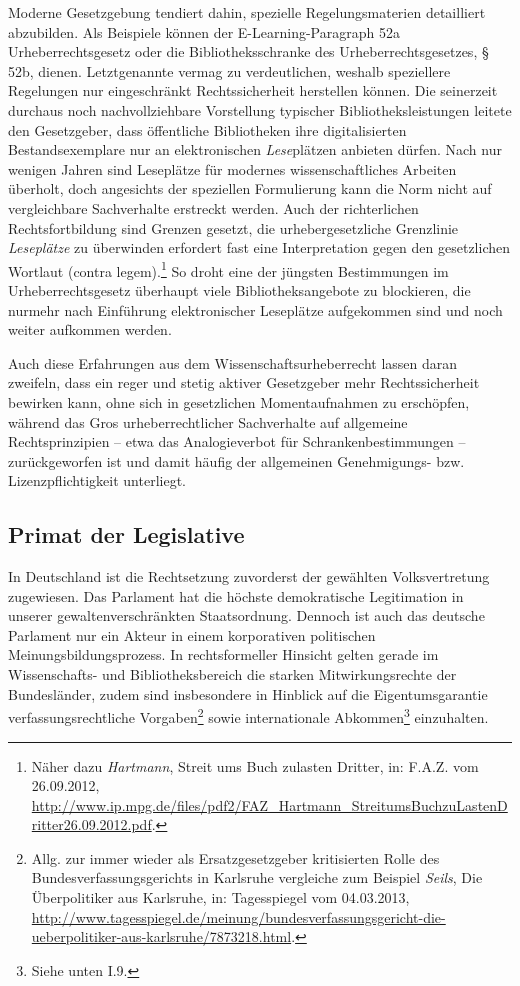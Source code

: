 \documentclass[output=paper]{langscibook}
\begin{document}
Moderne Gesetzgebung tendiert dahin, spezielle Regelungsmaterien
detailliert abzubilden. Als Beispiele können der E-Learning-Paragraph
52a Urheberrechtsgesetz oder die Bibliotheksschranke des
Urheberrechtsgesetzes, §\,52b, dienen. Letztgenannte vermag zu
verdeutlichen, weshalb speziellere Regelungen nur eingeschränkt
Rechtssicherheit herstellen können. Die seinerzeit durchaus noch
nachvollziehbare Vorstellung typischer Bibliotheksleistungen leitete den
Gesetzgeber, dass öffentliche Bibliotheken ihre digitalisierten
Bestandsexemplare nur an elektronischen \emph{Lese}plätzen anbieten
dürfen. Nach nur wenigen Jahren sind Leseplätze für modernes
wissenschaftliches Arbeiten überholt, doch angesichts der speziellen
Formulierung kann die Norm nicht auf vergleichbare Sachverhalte
erstreckt werden. Auch der richterlichen Rechtsfortbildung sind Grenzen
gesetzt, die urhebergesetzliche Grenzlinie \emph{Leseplätze} zu
überwinden erfordert fast eine Interpretation gegen den gesetzlichen
Wortlaut (contra legem).\footnote{Näher dazu \emph{Hartmann}, Streit ums
  Buch zulasten Dritter, in: F.A.Z. vom 26.09.2012,
  \url{http://www.ip.mpg.de/files/pdf2/FAZ_Hartmann_StreitumsBuchzuLastenDritter26.09.2012.pdf}.}
So droht eine der jüngsten Bestimmungen im Urheberrechtsgesetz überhaupt
viele Bibliotheksangebote zu blockieren, die nurmehr nach Einführung
elektronischer Leseplätze aufgekommen sind und noch weiter aufkommen
werden.

Auch diese Erfahrungen aus dem Wissenschaftsurheberrecht lassen daran
zweifeln, dass ein reger und stetig aktiver Gesetzgeber mehr
Rechtssicherheit bewirken kann, ohne sich in gesetzlichen
Momentaufnahmen zu erschöpfen, während das Gros urheberrechtlicher
Sachverhalte auf allgemeine Rechtsprinzipien -- etwa das Analogieverbot
für Schrankenbestimmungen -- zurückgeworfen ist und damit häufig der
allgemeinen Genehmigungs- bzw. Lizenzpflichtigkeit unterliegt.

\hypertarget{primat-der-legislative}{%
\subsection{Primat der Legislative}\label{primat-der-legislative}}

In Deutschland ist die Rechtsetzung zuvorderst der gewählten
Volksvertretung zugewiesen. Das Parlament hat die höchste demokratische
Legitimation in unserer gewaltenverschränkten Staatsordnung. Dennoch ist
auch das deutsche Parlament nur ein Akteur in einem korporativen
politischen Meinungsbildungsprozess. In rechtsformeller Hinsicht gelten
gerade im Wissenschafts- und Bibliotheksbereich die starken
Mitwirkungsrechte der Bundesländer, zudem sind insbesondere in Hinblick
auf die Eigentumsgarantie verfassungsrechtliche Vorgaben\footnote{Allg.
  zur immer wieder als Ersatzgesetzgeber kritisierten Rolle des
  Bundesverfassungsgerichts in Karlsruhe vergleiche zum Beispiel \emph{Seils}, Die
  Überpolitiker aus Karlsruhe, in: Tagesspiegel vom 04.03.2013,
  \url{http://www.tagesspiegel.de/meinung/bundesverfassungsgericht-die-ueberpolitiker-aus-karlsruhe/7873218.html}.}
sowie internationale Abkommen\footnote{Siehe unten I.9.} einzuhalten.
\end{document}
